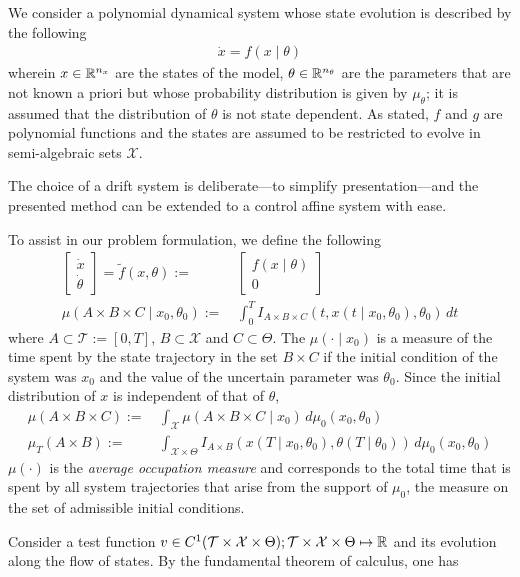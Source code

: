 \documentclass[10pt]{scrartcl}
\theoremstyle{remark}
\providecommand{\R}{\ensuremath \mathbb{R}}
\begin{document}
We consider a polynomial dynamical system whose state evolution is described by the following
\begin{align}
	\dot x=f(x\mid\theta)
\end{align}
wherein $x\in \R^{n_x}$ are the states of the model, $\theta\in \R^{n_\theta}$ are the parameters that are not known a priori but whose probability distribution is given by $\mu_{\theta}$; it is assumed that the distribution of $\theta$ is not state dependent. As stated, $f$ and $g$ are polynomial functions and the states are assumed to be restricted to evolve in semi-algebraic sets $\mathcal X$.
\par
The choice of a drift system is deliberate---to simplify presentation---and the presented method can be extended to a control affine system with ease.
\par 
To assist in our problem formulation, we define the following 
\begin{align}
\begin{bmatrix}\dot x\\\dot\theta\end{bmatrix}=\tilde f(x,\theta):=&\,\begin{bmatrix}f(x\mid\theta)\\0
\end{bmatrix}\\
	\mu(A\times B\times C\mid x_0,\theta_0):=&\,\int_{0}^T I_{A\times B\times C}(t,x(t\mid x_0,\theta_0),\theta_0) \,dt
\end{align}
where $A\subset \mathcal T:=[0,T]$, $B\subset \mathcal X$ and $C\subset \Theta$. The $\mu(\cdot\mid x_0)$ is a measure of the time spent by the state trajectory in the set $B\times C$ if the initial condition of the system was $x_0$ and the value of the uncertain parameter was $\theta_0$. Since the initial distribution of $x$ is independent of that of $\theta$,
\begin{align}
	\mu(A\times B\times C):=&\,\int_{\mathcal X} \mu(A\times B\times C\mid x_0) \,d\mu_0(x_0,\theta_0)\\
	\mu_T(A\times B):=&\,\int_{\mathcal X\times \Theta}I_{A\times B}(x(T\mid x_0,\theta_0),\theta(T\mid \theta_0))\,d\mu_0(x_0,\theta_0)
\end{align}
$\mu(\cdot)$ is the \emph{average occupation measure} and corresponds to the total time that is spent by all system trajectories that arise from the support of $\mu_0$, the measure on the set of admissible initial conditions.
\par
Consider a test function $v\in C^1(\mathcal T\times \mathcal X\times \Theta); \mathcal T\times \mathcal X\times \Theta\mapsto \R$ and its evolution along the flow of states. By the fundamental theorem of calculus, one has
\end{document}
